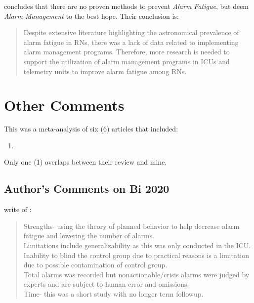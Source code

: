 \citet[p.13]{dee2022determining} concludes that there are no proven methods to prevent \textit{Alarm Fatigue}, but deem \textit{Alarm Management} to the best hope. Their conclusion is: \\

\begin{quotation}
	Despite extensive literature highlighting the astronomical
	prevalence of alarm fatigue in RNs, there was a lack of
	data related to implementing alarm management programs.
	Therefore, more research is needed to support the utilization
	of alarm management programs in ICUs and telemetry units
	to improve alarm fatigue among RNs.
\end{quotation}

\section{Other Comments}

This was a meta-analysis of six (6) articles that included:

\begin{enumerate}
	\item \citet{bi2020effects}
\end{enumerate}

Only one (1) overlaps between their review and mine.

\subsection{Author's Comments on Bi 2020}

\citet[pp.5-6]{dee2022determining} write of \citet{bi2020effects}: \\

\begin{quotation}
	Strengths- using the theory of planned behavior to help decrease alarm fatigue and lowering the number of alarms. \\
	Limitations include generalizability as this was only conducted in the ICU. \\
	Inability to blind the control group due to practical reasons is a limitation due to possible contamination of control group. \\
	Total alarms was recorded but nonactionable/crisis alarms were judged by experts and are subject to human error and omissions. \\
	Time- this was a short study with no longer term followup.
\end{quotation}
